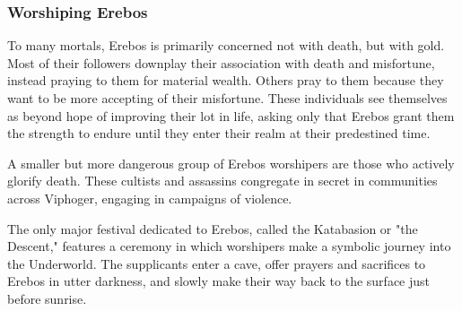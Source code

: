     \subsubsection{Worshiping Erebos}
        To many mortals, Erebos is primarily concerned not with death, but with gold.
        Most of their followers downplay their association with death and misfortune, instead praying to them for material wealth.
        Others pray to them because they want to be more accepting of their misfortune.
        These individuals see themselves as beyond hope of improving their lot in life, asking only that Erebos grant them the strength to endure until they enter their realm at their predestined time.

        A smaller but more dangerous group of Erebos worshipers are those who actively glorify death.
        These cultists and assassins congregate in secret in communities across Viphoger, engaging in campaigns of violence.

        The only major festival dedicated to Erebos, called the Katabasion or "the Descent," features a ceremony in which worshipers make a symbolic journey into the Underworld.
        The supplicants enter a cave, offer prayers and sacrifices to Erebos in utter darkness, and slowly make their way back to the surface just before sunrise.
